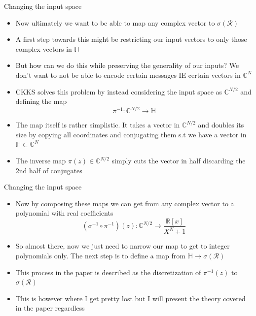 \documentclass{beamer}
\begin{document}
\begin{frame}{Changing the input space}
	\begin{itemize}[<+->]
		\item Now ultimately we want to be able to map any complex vector to $\sigma(\mathcal{R})$
		\item A first step towards this might be restricting our input vectors to only those complex vectors in $\mathbb{H}$
		\item But how can we do this while preserving the generality of our inputs? We don't want to not be able to encode
		certain messages IE certain vectors in $\mathbb{C}^N$
		\item CKKS solves this problem by instead considering the input space as $\mathbb{C}^{N/2}$ and defining the map
		\[\pi^{-1} : \mathbb{C}^{N/2} \to \mathbb{H}\]
		\item The map itself is rather simplistic. It takes a vector in $\mathbb{C}^{N/2}$ and doubles its size by copying
		all coordinates and conjugating them s.t we have a vector in $\mathbb{H} \subset \mathbb{C}^{N}$
		\item The inverse map $\pi(z) \in \mathbb{C}^{N/2}$ simply cuts the vector in half discarding the 2nd half of conjugates
	\end{itemize}
\end{frame}

\begin{frame}{Changing the input space}
	\begin{itemize}[<+->]
		\item Now by composing these maps we can get from any complex vector to a polynomial with real coefficients
		\[ (\sigma^{-1 } \circ \pi^{-1})(z) : \mathbb{C}^{N/2} \to \frac{\mathbb{R}[x]}{X^N + 1}\]
		\item So almost there, now we just need to narrow our map to get to integer polynomials only. The next step
		is to define a map from $\mathbb{H} \to \sigma(\mathcal{R})$
		\item This process in the paper is described as the discretization of $\pi^{-1}(z)$ to $\sigma(\mathcal{R})$
		\item This is however where I get pretty lost but I will present the theory covered in the paper regardless
	\end{itemize}
\end{frame}
\end{document}

